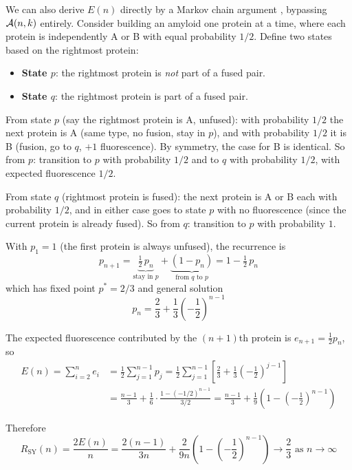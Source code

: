 \documentclass[referee,lineno,pdflatex,sn-mathphys-ay]{sn-jnl}
\newcommand{\cA}{ {\cal A} }
\begin{document}
We can also derive $E(n)$ directly by a Markov chain argument \citep{norris1997}, bypassing $\cA(n,k)$ entirely. Consider building an amyloid one protein at a time, where each protein is independently A or B with equal probability $1/2$. Define two states based on the rightmost protein:
\begin{itemize}
\item \textbf{State $p$}: the rightmost protein is \textit{not} part of a fused pair.
\item \textbf{State $q$}: the rightmost protein is part of a fused pair.
\end{itemize}

From state $p$ (say the rightmost protein is A, unfused): with probability $1/2$ the next protein is A (same type, no fusion, stay in $p$), and with probability $1/2$ it is B (fusion, go to $q$, $+1$ fluorescence). By symmetry, the case for B is identical. So from $p$: transition to $p$ with probability $1/2$ and to $q$ with probability $1/2$, with expected fluorescence $1/2$.

From state $q$ (rightmost protein is fused): the next protein is A or B each with probability $1/2$, and in either case goes to state $p$ with no fluorescence (since the current protein is already fused). So from $q$: transition to $p$ with probability $1$.

With $p_1 = 1$ (the first protein is always unfused), the recurrence is
\[
p_{n+1} = \underbrace{\tfrac{1}{2}\, p_n}_{\text{stay in }p} + \underbrace{(1 - p_n)}_{\text{from }q\text{ to }p} = 1 - \tfrac{1}{2}\, p_n
\]
which has fixed point $p^* = 2/3$ and general solution
\[
p_n = \frac{2}{3} + \frac{1}{3}\left(-\frac{1}{2}\right)^{n-1}
\]

The expected fluorescence contributed by the $(n+1)$th protein is $e_{n+1} = \frac{1}{2} p_n$, so
\begin{align*}
E(n) = \sum_{i=2}^{n} e_i &= \frac{1}{2} \sum_{j=1}^{n-1} p_j = \frac{1}{2} \sum_{j=1}^{n-1} \left[ \frac{2}{3} + \frac{1}{3}\left(-\frac{1}{2}\right)^{j-1} \right] \\
&= \frac{n-1}{3} + \frac{1}{6} \cdot \frac{1 - (-1/2)^{n-1}}{3/2} = \frac{n-1}{3} + \frac{1}{9}\left(1 - \left(-\frac{1}{2}\right)^{n-1}\right)
\end{align*}

Therefore
\[
R_{\text{SY}}(n) = \frac{2E(n)}{n} = \frac{2(n-1)}{3n} + \frac{2}{9n}\left(1 - \left(-\frac{1}{2}\right)^{n-1}\right) \longrightarrow \frac{2}{3} \text{ as } n \to \infty
\]
\end{document}

